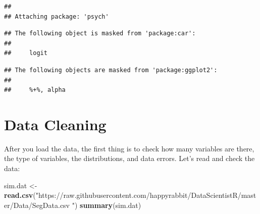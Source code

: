 \documentclass[]{book}
\newenvironment{Shaded}{\begin{snugshade}}{\end{snugshade}}
\newcommand{\KeywordTok}[1]{\textcolor[rgb]{0.13,0.29,0.53}{\textbf{{#1}}}}
\newcommand{\StringTok}[1]{\textcolor[rgb]{0.31,0.60,0.02}{{#1}}}
\newcommand{\NormalTok}[1]{{#1}}
\theoremstyle{definition}
\theoremstyle{definition}
\theoremstyle{remark}
\begin{document}
\begin{verbatim}
## 
## Attaching package: 'psych'
\end{verbatim}

\begin{verbatim}
## The following object is masked from 'package:car':
## 
##     logit
\end{verbatim}

\begin{verbatim}
## The following objects are masked from 'package:ggplot2':
## 
##     %+%, alpha
\end{verbatim}

\section{Data Cleaning}\label{data-cleaning}

After you load the data, the first thing is to check how many variables
are there, the type of variables, the distributions, and data errors.
Let's read and check the data:

\begin{Shaded}
\begin{Highlighting}[]
\NormalTok{sim.dat <-}\StringTok{ }\KeywordTok{read.csv}\NormalTok{(}\StringTok{"https://raw.githubusercontent.com/happyrabbit/DataScientistR/master/Data/SegData.csv "}\NormalTok{)}
\KeywordTok{summary}\NormalTok{(sim.dat)}
\end{Highlighting}
\end{Shaded}
\end{document}
